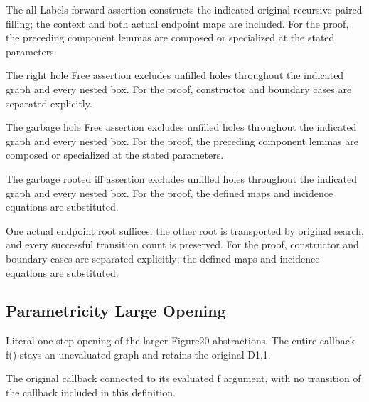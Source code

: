 The all Labels forward assertion constructs the indicated original recursive paired filling; the context and both actual endpoint maps are included.
For the proof, the preceding component lemmas are composed or specialized at the stated parameters.
\par{}

The right hole Free assertion excludes unfilled holes throughout the indicated graph and every nested box.
For the proof, constructor and boundary cases are separated explicitly.
\par{}

The garbage hole Free assertion excludes unfilled holes throughout the indicated graph and every nested box.
For the proof, the preceding component lemmas are composed or specialized at the stated parameters.
\par{}

The garbage rooted iff assertion excludes unfilled holes throughout the indicated graph and every nested box.
For the proof, the defined maps and incidence equations are substituted.
\par{}

One actual endpoint root suffices: the other root is transported by original search, and every successful transition count is preserved.
For the proof, constructor and boundary cases are separated explicitly; the defined maps and incidence equations are substituted.
\par{}

\subsection{Parametricity Large Opening}
Literal one-step opening of the larger Figure20 abstractions. The entire callback f() stays an unevaluated graph and retains the original D1,1.

The original callback connected to its evaluated f argument, with no transition of the callback included in this definition.
\par{}

